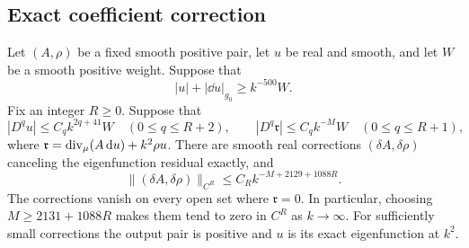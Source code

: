 \subsection{Exact coefficient correction}

\begin{lemma}\label{lem:correction}
Let $(A,\rho)$ be a fixed smooth positive pair, let $u$ be real and
smooth, and let $W$ be a smooth positive weight. Suppose that
\[
 |u|+|\dd u|_{g_0}\ge k^{-500}W.
\]
Fix an integer $R\ge0$. Suppose that
\[
 |D^qu|\le C_qk^{2q+41}W\quad(0\le q\le R+2),\qquad
 |D^q\mathfrak r|\le C_qk^{-M}W\quad(0\le q\le R+1),
\]
where $\mathfrak r=\operatorname{div}_\mu(A\,\mathrm d u)+k^2\rho u$.
There are smooth real corrections $(\delta A,\delta\rho)$ canceling
the eigenfunction residual exactly, and
\begin{equation}\label{eq:correction-size}
 \lVert(\delta A,\delta\rho)\rVert_{C^R}
 \le C_R k^{-M+2129+1088R}.
\end{equation}
The corrections vanish on every open set where $\mathfrak r=0$.
In particular, choosing $M\ge2131+1088R$ makes them tend to zero
in $C^R$ as $k\to\infty$. For sufficiently small corrections the
output pair is positive and $u$ is its exact eigenfunction at $k^2$.
\end{lemma}

